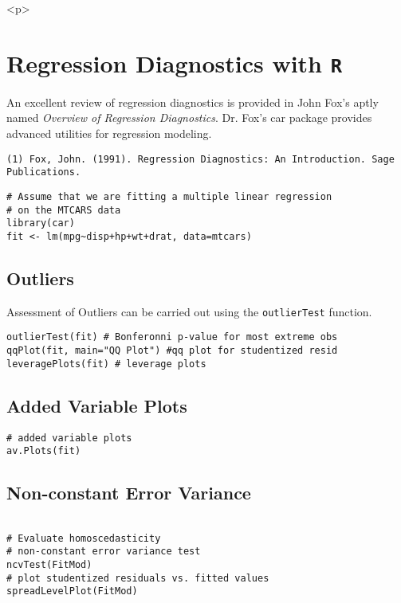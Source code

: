 \documentclass[main.tex]{subfiles}
\begin{document}
<p>
\section{Regression Diagnostics with \texttt{R} }

An excellent review of regression diagnostics is provided in John Fox's aptly named \textit{Overview of Regression Diagnostics}. Dr. Fox's car package provides advanced utilities for regression modeling.

\begin{verbatim}
(1) Fox, John. (1991). Regression Diagnostics: An Introduction. Sage Publications.
\end{verbatim}

\begin{framed}
\begin{verbatim}
# Assume that we are fitting a multiple linear regression
# on the MTCARS data
library(car)
fit <- lm(mpg~disp+hp+wt+drat, data=mtcars)

\end{verbatim}
\end{framed}


\subsection{Outliers}

Assessment of Outliers can be carried out using the \texttt{outlierTest} function.

\begin{framed}
\begin{verbatim}
outlierTest(fit) # Bonferonni p-value for most extreme obs
qqPlot(fit, main="QQ Plot") #qq plot for studentized resid 
leveragePlots(fit) # leverage plots
\end{verbatim}
\end{framed}
\subsection{Added Variable Plots}
\begin{framed}
\begin{verbatim}
# added variable plots 
av.Plots(fit)
\end{verbatim}
\end{framed}

\subsection{Non-constant Error Variance}
\begin{framed}
\begin{verbatim}

# Evaluate homoscedasticity
# non-constant error variance test
ncvTest(FitMod)
# plot studentized residuals vs. fitted values 
spreadLevelPlot(FitMod)
\end{verbatim}
\end{framed}
\end{document}

